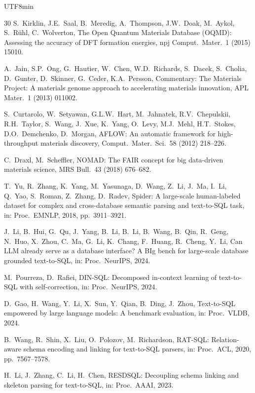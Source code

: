 \documentclass[sn-mathphys,Numbered]{sn-jnl}
\begin{document}
\begin{CJK}{UTF8}{min}
\begin{thebibliography}{30}
S.~Kirklin, J.E.~Saal, B.~Meredig, A.~Thompson, J.W.~Doak, M.~Aykol, S.~R\"uhl, C.~Wolverton,
The {Open Quantum Materials Database (OQMD)}: Assessing the accuracy of {DFT} formation energies,
npj Comput.\ Mater.\ 1 (2015) 15010.

A.~Jain, S.P.~Ong, G.~Hautier, W.~Chen, W.D.~Richards, S.~Dacek, S.~Cholia, D.~Gunter, D.~Skinner, G.~Ceder, K.A.~Persson,
Commentary: {The Materials Project}: A materials genome approach to accelerating materials innovation,
APL Mater.\ 1 (2013) 011002.

S.~Curtarolo, W.~Setyawan, G.L.W.~Hart, M.~Jahnatek, R.V.~Chepulskii, R.H.~Taylor, S.~Wang, J.~Xue, K.~Yang, O.~Levy, M.J.~Mehl, H.T.~Stokes, D.O.~Demchenko, D.~Morgan,
{AFLOW}: An automatic framework for high-throughput materials discovery,
Comput.\ Mater.\ Sci.\ 58 (2012) 218--226.

C.~Draxl, M.~Scheffler,
{NOMAD}: {The FAIR} concept for big data-driven materials science,
MRS Bull.\ 43 (2018) 676--682.

T.~Yu, R.~Zhang, K.~Yang, M.~Yasunaga, D.~Wang, Z.~Li, J.~Ma, I.~Li, Q.~Yao, S.~Roman, Z.~Zhang, D.~Radev,
Spider: A large-scale human-labeled dataset for complex and cross-database semantic parsing and text-to-SQL task,
in: Proc.\ EMNLP, 2018, pp.~3911--3921.

J.~Li, B.~Hui, G.~Qu, J.~Yang, B.~Li, B.~Li, B.~Wang, B.~Qin, R.~Geng, N.~Huo, X.~Zhou, C.~Ma, G.~Li, K.~Chang, F.~Huang, R.~Cheng, Y.~Li,
Can LLM already serve as a database interface? A BIg bench for large-scale database grounded text-to-SQL,
in: Proc.\ NeurIPS, 2024.

M.~Pourreza, D.~Rafiei,
DIN-SQL: Decomposed in-context learning of text-to-SQL with self-correction,
in: Proc.\ NeurIPS, 2024.

D.~Gao, H.~Wang, Y.~Li, X.~Sun, Y.~Qian, B.~Ding, J.~Zhou,
Text-to-SQL empowered by large language models: A benchmark evaluation,
in: Proc.\ VLDB, 2024.

B.~Wang, R.~Shin, X.~Liu, O.~Polozov, M.~Richardson,
RAT-SQL: Relation-aware schema encoding and linking for text-to-SQL parsers,
in: Proc.\ ACL, 2020, pp.~7567--7578.

H.~Li, J.~Zhang, C.~Li, H.~Chen,
RESDSQL: Decoupling schema linking and skeleton parsing for text-to-SQL,
in: Proc.\ AAAI, 2023.


\end{thebibliography}
\end{CJK}
\end{document}

